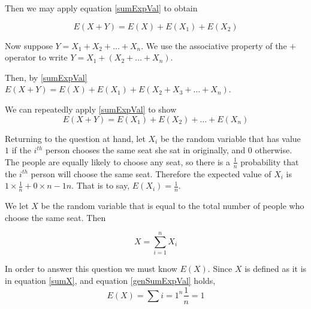 \documentclass[a4paper,11pt]{article}
\begin{document}
Then we may apply equation \ref{sumExpVal} to obtain

\begin{equation} \label{sumExpVal1}
  E \left( X + Y \right) = E \left( X \right) + E \left( X_{1} \right) 
  + E \left( X_{2} \right)
\end{equation}

Now suppose $Y = X_{1} + X_{2} + \ldots + X_{n}$.  We use the 
associative property of the $+$ operator to write $Y = X_{1} + \left(
X_{2} + \ldots + X_{n} \right)$.

Then, by \ref{sumExpVal} $E \left( X + Y \right) = E\left( X \right) + 
E\left( X_{1} \right) + E \left( X_{2} + X_{3} + \ldots + 
X_{n} \right)$.

We can repeatedly apply \ref{sumExpVal} to show 
\begin{equation} \label{genSumExpVal}
E \left( X + Y \right)
 = E \left(X_{1} \right) + E \left( X_{2} \right) + \ldots +
 E \left( X_{n} \right)
\end{equation}
 
Returning to the question at hand, let $X_{i}$ be the random variable
that has value $1$ if the $i^{th}$ person chooses the same seat
she sat in originally, and $0$ otherwise.  The people are equally likely
to choose any seat, so there is a $\frac{1}{n}$ probability that
the $i^{th}$ person will choose the same seat. Therefore the expected
value of $X_{i}$ is $1 \times \frac{1}{n} + 0 \times{n-1}{n}$. That is
to say, $ E \left( X_{i} \right) = \frac{1}{n}$. 

We let $X$ be the random variable that is equal to the total number of
people who choose the same seat. Then 

\begin{equation}\label{sumX}
 X = \sum_{i=1}^{n} X_{i}
\end{equation}

In order to answer this question we must know $E \left( X \right)$.
Since $X$ is defined as it is in equation \ref{sumX}, and equation
\ref{genSumExpVal} holds, 
\begin{equation}
 E \left( X  \right) = \sum {i=1}^{n} \frac{1}{n} = 1
\end{equation}

\printbibliography{}
\end{document}
